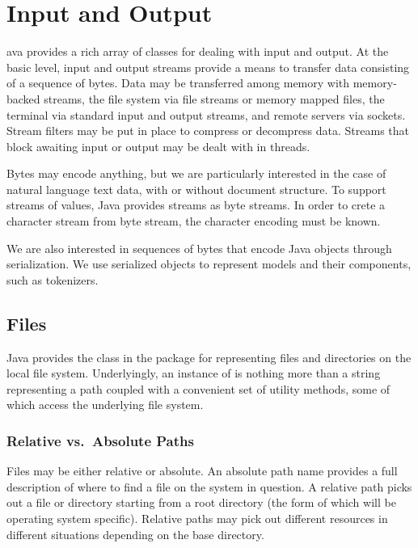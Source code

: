 \chapter{Input and Output}\label{chap:io}

ava provides a rich array of classes for dealing with
input and output.  At the basic level, input and output streams
provide a means to transfer data consisting of a sequence of bytes.
Data may be transferred among memory with memory-backed streams, the
file system via file streams or memory mapped files, the terminal via
standard input and output streams, and remote servers via sockets.
Stream filters may be put in place to compress or decompress data.
Streams that block awaiting input or output may be dealt with in
threads.

Bytes may encode anything, but we are particularly interested in the
case of natural language text data, with or without document
structure.  To support streams of  values, Java provides
 streams as byte streams.  In order to crete a character
stream from byte stream, the character encoding must be known.

We are also interested in sequences of bytes that encode Java objects
through serialization.  We use serialized objects to represent models
and their components, such as tokenizers.  


\section{Files}

Java provides the class  in the  package for
representing files and directories on the local file system.
Underlyingly, an instance of  is nothing more than a string
representing a path coupled with a convenient set of utility methods,
some of which access the underlying file system.  

\subsection{Relative vs.\ Absolute Paths}

Files may be either relative or absolute.  An absolute path name
provides a full description of where to find a file on the system in
question.  A relative path picks out a file or directory starting from
a root directory (the form of which will be operating system
specific).  Relative paths may pick out different resources in
different situations depending on the base directory.

